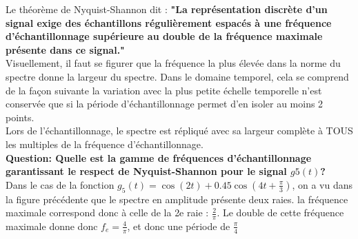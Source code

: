 \documentclass[11pt,a4paper]{article}
\begin{document}
Le théorème de Nyquist-Shannon dit : \textbf{"La représentation discrète d'un signal exige des échantillons régulièrement espacés à une fréquence d'échantillonnage supérieure au double de la fréquence maximale présente dans ce signal."}\\

Visuellement, il faut se figurer que la fréquence la plus élevée dans la norme du spectre donne la largeur du spectre. Dans le domaine temporel, cela se comprend de la façon suivante la variation avec la plus petite échelle temporelle n'est conservée que si la période d'échantillonnage permet d'en isoler au moins 2 points.\\

Lors de l'échantillonnage, le spectre est répliqué avec sa largeur complète à TOUS les multiples de la fréquence d'échantillonnage.\\

\textbf{Question: Quelle est la gamme de fréquences d'échantillonnage garantissant le respect de Nyquist-Shannon pour le signal $g5(t)$?}\\

Dans le cas de la fonction $g_5(t) = \cos(2 t) + 0.45 \cos(4 t + \frac{\pi}{3})$, on a vu dans la figure précédente que le spectre en amplitude présente deux raies. la fréquence maximale correspond donc à celle de la 2e raie : $\frac{2}{\pi}$. Le double de cette fréquence maximale donne donc $f_e = \frac{4}{\pi}$, et donc une période de $\frac{\pi}{4}$\\

\begin{center}
\end{center}
\end{document}
